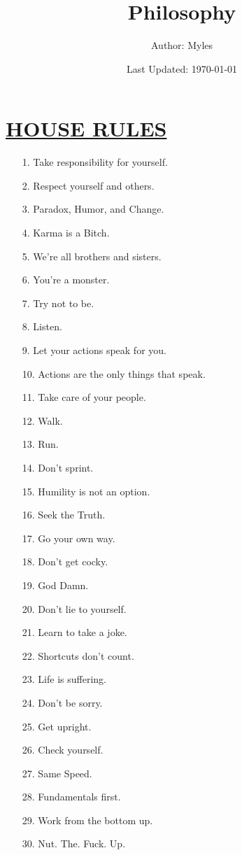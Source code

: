 \documentclass[11pt]{article}
\title{	
	\normalfont \normalsize 
	\huge Philosophy
}
\author{Author: Myles}
\date{Last Updated: \normalsize\today}
\begin{document}
\maketitle
\section*{\ul{HOUSE RULES}}
\begin{enumerate}
	
	\item[1.] Take responsibility for yourself.
	\item[2.] Respect yourself and others.
	\item[3.] Paradox, Humor, and Change.
	\item[4.] Karma is a Bitch.
	\item[5.] We're all brothers and sisters.
	\item[6.] You're a monster.
	\item[7.] Try not to be.
	\item[8.] Listen.
	\item[9.] Let your actions speak for you.
	\item[10.] Actions are the only things that speak.
	\item[11.] Take care of your people.
	\item[12.] Walk.
	\item[13.] Run.
	\item[14.] Don't sprint.
	\item[15.] Humility is not an option.
	\item[16.] Seek the Truth.
	\item[17.] Go your own way.
	\item[18.] Don't get cocky.
	\item[19.] God Damn.
	\item[20.] Don't lie to yourself.
	\item[21.] Learn to take a joke.
	\item[22.] Shortcuts don't count.
	\item[23.] Life is suffering.
	\item[24.] Don't be sorry.
	\item[25.] Get upright.
	\item[26.] Check yourself.
	\item[27.] Same Speed.
	\item[28.] Fundamentals first.
	\item[29.] Work from the bottom up.
	\item[30.] Nut. The. Fuck. Up.

\end{enumerate}
\end{document}
